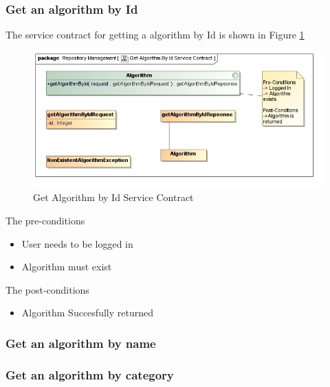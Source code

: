\subsubsection {Get an algorithm by Id}
The service contract for getting a algorithm by Id is shown in Figure \ref{fig:getAlgoByIdService}
\begin{figure}[H]
  \begin{center}
  \includegraphics[scale=0.6]{../Diagrams and Charts/Test Data/Get Algorithm By Id Service Contract.jpg}
  \caption{Get Algorithm by Id Service Contract}
  \label{fig:getAlgoByIdService}
  \end{center}
  
\end{figure}

The pre-conditions
\begin{itemize}
  \item User needs to be logged in
  \item Algorithm must exist
\end{itemize}

The post-conditions
\begin{itemize}
  \item Algorithm Succesfully returned
\end{itemize}

\subsubsection {Get an algorithm by name}
\subsubsection {Get an algorithm by category}
